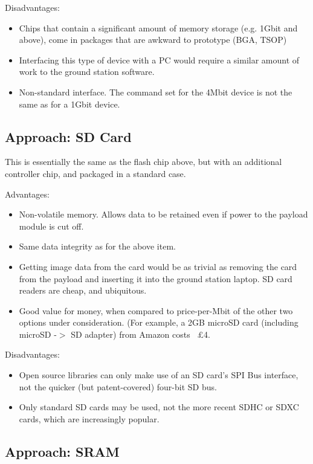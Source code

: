 Disadvantages:
\begin{itemize}
\item Chips that contain a significant amount of memory storage (e.g. 1Gbit 
and above), come in packages that are awkward to prototype (BGA, TSOP)
\item Interfacing this type of device with a PC would require a similar amount 
of work to the ground station software.
\item Non-standard interface. The command set for the 4Mbit device is not the 
same as for a 1Gbit device.
\end{itemize}



\subsection{Approach: SD Card}

This is essentially the same as the flash chip above, but with an additional controller chip, and packaged in a standard case.

Advantages:
\begin{itemize}
\item Non-volatile memory. Allows data to be retained even if power to the payload module is cut off.
\item Same data integrity as for the above item.
\item Getting image data from the card would be as trivial as removing the 
card from the payload and inserting it into the ground station laptop. SD card 
readers are cheap, and ubiquitous.
\item Good value for money, when compared to price-per-Mbit of the other two 
options under consideration. (For example, a 2GB microSD card (including 
microSD -$>$ SD adapter) from Amazon costs ~£4.
\end{itemize}

Disadvantages:
\begin{itemize}
\item Open source libraries can only make use of an SD card's SPI Bus
interface, not the quicker (but patent-covered) four-bit SD bus.
\item Only standard SD cards may be used, not the more recent SDHC or SDXC 
cards, which are increasingly popular.
\end{itemize}

\subsection{Approach: SRAM}

